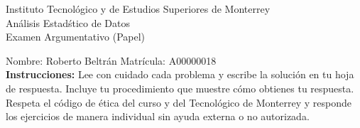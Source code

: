 \documentclass[10pt]{report}
\begin{document}
\newpage



\begin{center}
{\large Instituto Tecnol\'{o}gico y de Estudios Superiores de Monterrey \\
An\'alisis Estad\'stico de Datos } \\
Examen Argumentativo (Papel)
\end{center}

Nombre: \underline{\hspace*{.2in}}
Roberto Beltrán
\underline{\hspace*{.2in}} \quad Matr\'icula:\underline{\hspace*{.2in}}
A00000018
\underline{\hspace*{.2in}} \\

{\bf Instrucciones:} Lee con cuidado cada problema y escribe la soluci\'on
en tu hoja de respuesta. Incluye tu procedimiento que muestre c\'omo obtienes tu respuesta.  Respeta el c\'odigo de \'etica del curso y del Tecnol\'ogico de Monterrey y responde los ejercicios de manera individual sin ayuda externa o no autorizada.
\end{document}
